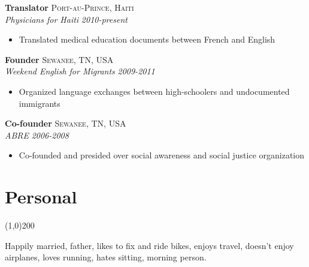 \documentclass[11pt]{article}
\begin{document}
\noindent \textbf{Translator} \hfill \textsc{Port-au-Prince, Haiti}\\
\noindent \emph{Physicians for Haiti} \hfill \emph{2010-present}
\vspace{-2mm}
\begin{itemize}\itemsep0pt \parskip0pt 
\item Translated medical education documents between French and English
\end{itemize}

\noindent \textbf{Founder} \hfill \textsc{Sewanee, TN, USA}\\
\noindent \emph{Weekend English for Migrants} \hfill \emph{2009-2011}
\vspace{-2mm}
\begin{itemize}\itemsep0pt \parskip0pt 
\item Organized language exchanges between high-schoolers and undocumented immigrants
\end{itemize}


\noindent \textbf{Co-founder} \hfill \textsc{Sewanee, TN, USA}\\
\noindent \emph{ABRE} \hfill \emph{2006-2008}
\vspace{-2mm}
\begin{itemize}\itemsep0pt \parskip0pt 
\item Co-founded and presided over social awareness and social justice organization
\end{itemize}






\section*{Personal} %
\vspace{-7mm}
\line(1,0){200}
\vspace{2mm}

\noindent Happily married, father, likes to fix and ride bikes, enjoys travel, doesn't enjoy airplanes, loves running, hates sitting, morning person.
\end{document}
